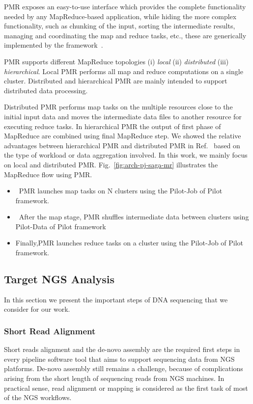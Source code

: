 \documentclass{acm_proc_article-sp}
\begin{document}
PMR exposes an easy-to-use interface which provides the complete
functionality needed by any MapReduce-based application, while hiding
the more complex functionality, such as chunking of the input, sorting
the intermediate results, managing and coordinating the map and reduce
tasks, etc., these are generically implemented by the
framework~\cite{pmr2012}.  

PMR supports different MapReduce topologies (i) \emph{local} (ii)
\emph{distributed} (iii) \emph{hierarchical}. Local PMR performs all
map and reduce computations on a single cluster.  Distributed and
hierarchical PMR are mainly intended to support distributed data
processing. 

Distributed PMR performs map tasks on the multiple resources close to
the initial input data and moves the intermediate data files to
another resource for executing reduce tasks. In hierarchical PMR the
output of first phase of MapReduce are combined using final MapReduce
step. We showed the relative advantages between hierarchical PMR and
distributed PMR in Ref.~\cite{pmr2012} based on the type of workload
or data aggregation involved. In this work, we mainly focus on local
and distributed PMR.  Fig.~\ref{fig:arch-pj-saga-mr} illustrates the
MapReduce flow using PMR.

\begin{itemize}
\item{~PMR launches map tasks on N clusters using the Pilot-Job of Pilot framework.}
\item{~After the map stage, PMR shuffles intermediate data between clusters using Pilot-Data of Pilot framework} 
\item{Finally,PMR launches reduce tasks on a cluster using the Pilot-Job of Pilot framework.}
\end{itemize}

\subsection{Target NGS Analysis}

In this section we present the important steps of DNA sequencing that
we consider for our work.

\subsubsection{Short Read Alignment}

Short reads alignment and the de-novo assembly are the required first
steps in every pipeline software tool that aims to support sequencing
data from NGS platforms.  De-novo assembly still remains a challenge,
because of complications arising from the short length of sequencing
reads from NGS machines. In practical sense, read alignment or mapping
is considered as the first task of most of the NGS
workflows. 
\end{document}
